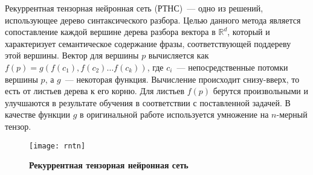 Рекуррентная тензорная нейронная сеть (РТНС)~--- одно из решений, использующее дерево синтаксического разбора. Целью данного метода является сопоставление каждой вершине дерева разбора вектора в $\mathbb{R}^d$, 
который и характеризует семантическое содержание фразы, соответствующей поддереву этой вершины.
Вектор для вершины $p$ вычисляется как $f(p)=g(f(c_1), f(c_2) \dots{} f(c_k))$, где $c_i$~--- непосредственные потомки вершины $p$, а $g$~--- некоторая функция. Вычисление происходит снизу-вверх, то
есть от листьев дерева к его корню. Для листьев $f(p)$ берутся произвольными и улучшаются в результате обучения в соответствии с поставленной задачей.
В качестве функции $g$ в оригинальной работе\cite{socher-EtAl:2013:EMNLP} используется умножение на $n$-мерный тензор.

\begin{figure}[h]
\texttt{[image: rntn]}
\caption{\textbf{Рекуррентная тензорная нейронная сеть}}
\label{fig:rntn}
\end{figure}